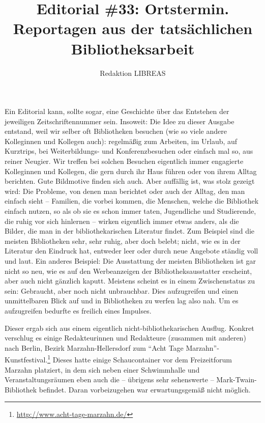 \documentclass[a4paper,
fontsize=11pt,
oneside,
numbers=noperiodatend,
parskip=half-,
bibliography=totoc,
final
]{scrartcl}
\title{\LARGE{Editorial \#33: Ortstermin. Reportagen aus der tatsächlichen Bibliotheksarbeit}} %
\author{Redaktion LIBREAS} %
\date{}
\begin{document}
\maketitle
\thispagestyle{fancyplain} 


Ein Editorial kann, sollte sogar, eine Geschichte über das Entstehen der
jeweiligen Zeitschriftennummer sein. Insoweit: Die Idee zu dieser
Ausgabe entstand, weil wir selber oft Bibliotheken besuchen (wie so
viele andere Kolleginnen und Kollegen auch): regelmäßig zum Arbeiten, im
Urlaub, auf Kurztrips, bei Weiterbildungs- und Konferenzbesuchen oder
einfach mal so, aus reiner Neugier. Wir treffen bei solchen Besuchen
eigentlich immer engagierte Kolleginnen und Kollegen, die gern durch ihr
Haus führen oder von ihrem Alltag berichten. Gute Bildmotive finden sich
auch. Aber auffällig ist, was stolz gezeigt wird: Die Probleme, von
denen man berichtet oder auch der Alltag, den man einfach sieht --
Familien, die vorbei kommen, die Menschen, welche die Bibliothek einfach
nutzen, so als ob sie es schon immer taten, Jugendliche und Studierende,
die ruhig vor sich hinlernen -- wirken eigentlich immer etwas anders,
als die Bilder, die man in der bibliothekarischen Literatur findet. Zum
Beispiel sind die meisten Bibliotheken sehr, sehr ruhig, aber doch
belebt; nicht, wie es in der Literatur den Eindruck hat, entweder leer
oder durch neue Angebote ständig voll und laut. Ein anderes Beispiel:
Die Ausstattung der meisten Bibliotheken ist gar nicht so neu, wie es
auf den Werbeanzeigen der Bibliotheksausstatter erscheint, aber auch
nicht gänzlich kaputt. Meistens scheint es in einem Zwischenstatus zu
sein: Gebraucht, aber noch nicht unbrauchbar. Dies aufzugreifen und
einen unmittelbaren Blick auf und in Bibliotheken zu werfen lag also
nah. Um es aufzugreifen bedurfte es freilich eines Impulses.

Dieser ergab sich aus einem eigentlich nicht-bibliothekarischen Ausflug.
Konkret verschlug es einige Redakteurinnen und Redakteure (zusammen mit
anderen) nach Berlin, Bezirk Marzahn-Hellersdorf zum \enquote{Acht Tage
Marzahn}-Kunstfestival.\footnote{\url{http://www.acht-tage-marzahn.de/}}
Dieses hatte einige Schaucontainer vor dem Freizeitforum Marzahn
platziert, in dem sich neben einer Schwimmhalle und Veranstaltungsräumen
eben auch die -- übrigens sehr sehenswerte -- Mark-Twain-Bibliothek
befindet. Daran vorbeizugehen war erwartungsgemäß nicht möglich.
\end{document}
